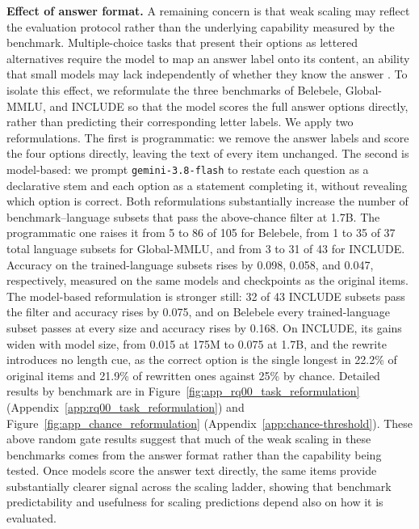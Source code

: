 \textbf{Effect of answer format.}
A remaining concern is that weak scaling may reflect the evaluation protocol rather than the underlying capability measured by the benchmark.
Multiple-choice tasks that present their options as lettered alternatives require the model to map an answer label onto its content, an ability that small models may lack independently of whether they know the answer \citeneeded. %
To isolate this effect, we reformulate the three benchmarks of Belebele, Global-MMLU, and INCLUDE so that the model scores the full answer options directly, rather than predicting their corresponding letter labels.
We apply two reformulations. The first is programmatic: we remove the answer labels and score the four options directly, leaving the text of every item unchanged.
The second is model-based: we prompt \texttt{gemini-3.8-flash} \citep{gemini_team_gemini_2024} to restate each question as a declarative stem and each option as a statement completing it, without revealing which option is correct.
Both reformulations substantially increase the number of benchmark--language subsets that pass the above-chance filter at 1.7B. The programmatic one raises it from 5 to 86 of 105 for Belebele, from 1 to 35 of 37 total language subsets for Global-MMLU, and from 3 to 31 of 43 for INCLUDE. Accuracy on the trained-language subsets rises by 0.098, 0.058, and 0.047, respectively, measured on the same models and checkpoints as the original items. The model-based reformulation is stronger still: 32 of 43 INCLUDE subsets pass the filter and accuracy rises by 0.075, and on Belebele every trained-language subset passes at every size and accuracy rises by 0.168. On INCLUDE, its gains widen with model size, from 0.015 at 175M to 0.075 at 1.7B, and the rewrite introduces no length cue, as the correct option is the single longest in 22.2\% of original items and 21.9\% of rewritten ones against 25\% by chance. Detailed results by benchmark are in Figure~\ref{fig:app_rq00_task_reformulation} (Appendix~\ref{app:rq00_task_reformulation}) and Figure~\ref{fig:app_chance_reformulation} (Appendix~\ref{app:chance-threshold}).
These above random gate results suggest that much of the weak scaling in these benchmarks comes from the answer format rather than the capability being tested.
Once models score the answer text directly, the same items provide substantially clearer signal across the scaling ladder, showing that benchmark predictability and usefulness for scaling predictions depend also on how it is evaluated.

